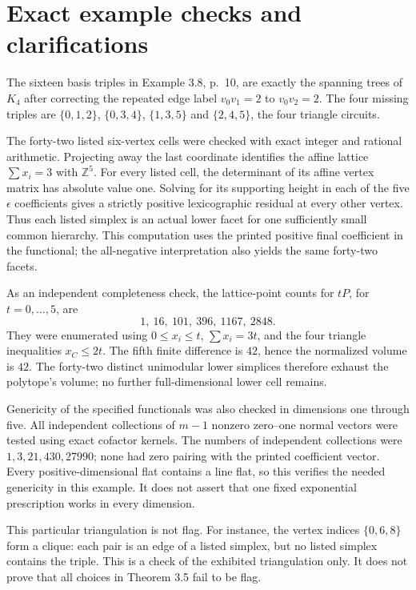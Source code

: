 \documentclass[10pt]{article}
\begin{document}
\section*{Exact example checks and clarifications}
The sixteen basis triples in Example 3.8, p. 10, are exactly the spanning trees of \(K_4\) after correcting the repeated edge label \(v_0v_1=2\) to \(v_0v_2=2\). The four missing triples are \(\{0,1,2\}\), \(\{0,3,4\}\), \(\{1,3,5\}\) and \(\{2,4,5\}\), the four triangle circuits.\par
The forty-two listed six-vertex cells were checked with exact integer and rational arithmetic. Projecting away the last coordinate identifies the affine lattice \(\sum x_i=3\) with \(\mathbb Z^5\). For every listed cell, the determinant of its affine vertex matrix has absolute value one. Solving for its supporting height in each of the five \(\epsilon\) coefficients gives a strictly positive lexicographic residual at every other vertex. Thus each listed simplex is an actual lower facet for one sufficiently small common hierarchy. This computation uses the printed positive final coefficient in the functional; the all-negative interpretation also yields the same forty-two facets.\par
As an independent completeness check, the lattice-point counts for \(tP\), for \(t=0,\ldots,5\), are \[1,\ 16,\ 101,\ 396,\ 1167,\ 2848.\] They were enumerated using \(0\le x_i\le t\), \(\sum x_i=3t\), and the four triangle inequalities \(x_C\le2t\). The fifth finite difference is \(42\), hence the normalized volume is \(42\). The forty-two distinct unimodular lower simplices therefore exhaust the polytope’s volume; no further full-dimensional lower cell remains.\par
Genericity of the specified functionals was also checked in dimensions one through five. All independent collections of \(m-1\) nonzero zero–one normal vectors were tested using exact cofactor kernels. The numbers of independent collections were \(1,3,21,430,27990\); none had zero pairing with the printed coefficient vector. Every positive-dimensional flat contains a line flat, so this verifies the needed genericity in this example. It does not assert that one fixed exponential prescription works in every dimension.\par
This particular triangulation is not flag. For instance, the vertex indices \(\{0,6,8\}\) form a clique: each pair is an edge of a listed simplex, but no listed simplex contains the triple. This is a check of the exhibited triangulation only. It does not prove that all choices in Theorem 3.5 fail to be flag.\par
\end{document}
